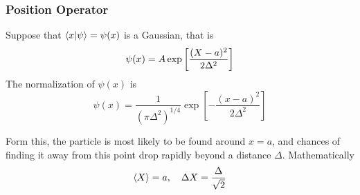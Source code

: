 \documentclass[../../../main.tex]{subfiles}
\begin{document}
\subsubsection{Position Operator}
Suppose that $\braket{x|\psi}=\psi(x)$ is a Gaussian, that is 
\begin{equation*}
    \psi(x)=A \exp \left[ \-\frac{(X-a)^2 }{2\Delta^2} \right] 
\end{equation*}
The normalization of $\psi(x )$ is 
\begin{equation*}
    \psi(x)=\frac{1 }{(\pi\Delta^2)^{1/4}}\exp \left[ -\frac{(x-a )^2}{2\Delta^2} \right] 
\end{equation*}

Form this, the particle is most likely to be found around $x =a$, and chances of finding it away from this point drop rapidly beyond a distance $\Delta$. 
Mathematically
\begin{equation*}
    \braket{X}=a,\quad\Delta X=\frac{\Delta}{\sqrt{2}}
\end{equation*}
\end{document}
